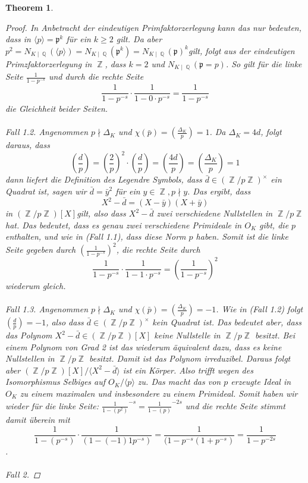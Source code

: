 \documentclass[10pt,a4paper]{article}
\theoremstyle{plain}
\newtheorem{thm}{Theorem}[section]
\theoremstyle{definition}
\theoremstyle{remark}
\DeclareMathOperator{\Q}{\mathbb{Q}}
\DeclareMathOperator{\Z}{\mathbb{Z}}
\begin{document}
\begin{thm}
\begin{proof}
In Anbetracht der eindeutigen Primfaktorzerlegung kann das nur bedeuten, dass in $\langle p\rangle =\mathfrak{p}^k$ für ein $k\geq 2$ gilt. Da aber $p^2=N_{K\mid \Q}(\langle p\rangle)=N_{K\mid \Q}(\mathfrak{p}^k) =N_{K\mid \Q}(\mathfrak{p})^k $gilt, folgt aus der eindeutigen Primzfaktorzerlegung in $\Z$, dass $k = 2$ und $N_{K\mid\Q}(\mathfrak{p}=p)$. So gilt für die linke Seite $\frac{1}{1-p^{-s}}$ und durch die rechte Seite $$\frac{1}{1-p^{-s}}\cdot \frac{1}{1-0\cdot p^{-s}}=\frac{1}{1-p^{-s}}$$ die Gleichheit beider Seiten.
\\
\\
\textit{Fall 1.2.}
Angenommen $p \nmid \Delta_K$ und $\chi(\bar{p})=(\frac{\Delta_K}{p})= 1$. Da $\Delta_K = 4d$, folgt daraus, dass $$(\frac{d}{p})=(\frac{2}{p})^2\cdot (\frac{d}{p})=(\frac{4d}{p})=(\frac{\Delta_K}{p})=1$$ dann liefert die Definition des Legendre Symbols, dass $\bar{d} \in (\Z/p\Z)^\times$ ein Quadrat ist, sagen wir $\bar{d}=\bar{y}^2$ für ein $y \in \Z, p\nmid y$. Das ergibt, dass $$X^2-\bar{d}=(X-\bar{y})(X+\bar{y})$$ in $(\Z/p\Z)[X] $gilt, also dass $X^2-\bar{d}$ zwei verschiedene Nullstellen in $\Z/p\Z$ hat. Das bedeutet, dass es genau zwei verschiedene Primideale in $O_K$ gibt, die $p$ enthalten, und wie in (Fall 1.1), dass diese Norm $p$ haben. Somit ist die linke Seite gegeben durch $(\frac{1}{1-p^{-s}})^2$, die rechte Seite durch $$\frac{1}{1-p^{-s}}\cdot\frac{1}{1-1\cdot p^{-s}}=(\frac{1}{1-p^{-s}})^2$$ wiederum gleich.
\\
\\
\textit{Fall 1.3.}
Angenommen $p \nmid \Delta_K$ und $\chi(\bar{p})=(\frac{\Delta_K}{p})= -1$. Wie in (Fall 1.2) folgt $(\frac{d}{p})=-1$, also dass $\bar{d} \in (\Z/p\Z)^\times$ kein Quadrat ist. Das bedeutet aber, dass das Polynom $X^2-\bar{d} \in (\Z/p\Z)[X] $ keine Nullstelle in $\Z/p\Z$ besitzt. Bei einem Polynom von Grad 2 ist das wiederum äquivalent dazu, dass es keine Nullstellen in $\Z/p\Z$ besitzt. Damit ist das Polynom irreduzibel. Daraus folgt aber $(\Z/p\Z)[X]/\langle X^{2}-\bar{d}\rangle$ ist ein Körper. Also trifft wegen des Isomorphismus Selbiges auf $O_K/\langle p\rangle$ zu. Das macht das von $p$ erzeugte Ideal in $O_K$ zu einem maximalen und insbesondere zu einem Primideal. Somit haben wir wieder für die linke Seite: $\frac{1}{1-(p^{2})}^{-s}=\frac{1}{1-(p)}^{-2s}$ und die rechte Seite stimmt damit überein mit $$\frac{1}{1-(p^{-s})}\cdot\frac{1}{(1-(-1)1p^{-s})}=\frac{1}{(1-p^{-s}(1+p^{-s})}=\frac{1}{1-p^{-2s}}$$.
\\
\\
\textit{Fall 2.}

\end{proof}
\end{thm}
\end{document}
